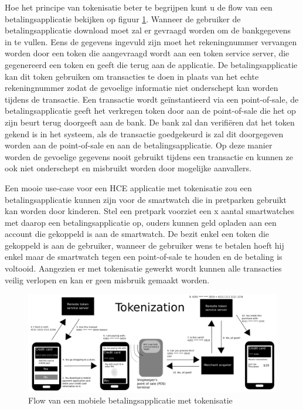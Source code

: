 Hoe het principe van tokenisatie beter te begrijpen kunt u de flow van een betalingsapplicatie bekijken op figuur \ref{fig:Tokenization}. Wanneer de gebruiker de betalingsapplicatie download moet zal er gevraagd worden om de bankgegevens in te vullen. Eens de gegevens ingevuld zijn moet het rekeningnummer vervangen worden door een token die aangevraagd wordt aan een token service server, die gegenereerd een token en geeft die terug aan de applicatie. De betalingsapplicatie kan dit token gebruiken om transacties te doen in plaats van het echte rekeningnummer zodat de gevoelige informatie niet onderschept kan worden tijdens de transactie. Een transactie wordt geïnstantieerd via een point-of-sale, de betalingsapplicatie geeft het verkregen token door aan de point-of-sale die het op zijn beurt terug doorgeeft aan de bank. De bank zal dan verifiëren dat het token gekend is in het systeem, als de transactie goedgekeurd is zal dit doorgegeven worden aan de point-of-sale en aan de betalingsapplicatie. Op deze manier worden de gevoelige gegevens nooit gebruikt tijdens een transactie en kunnen ze ook niet onderschept en misbruikt worden door mogelijke aanvallers.

Een mooie use-case voor een HCE applicatie met tokenisatie zou een betalingsapplicatie kunnen zijn voor de smartwatch die in pretparken gebruikt kan worden door kinderen. Stel een pretpark voorziet een x aantal smartwatches met daarop een betalingsapplicatie op, ouders kunnen geld opladen aan een account die gekoppeld is aan de smartwatch. De bezit enkel een token die gekoppeld is aan de gebruiker, wanneer de gebruiker wens te betalen hoeft hij enkel maar de smartwatch tegen een point-of-sale te houden en de betaling is voltooid. Aangezien er met tokenisatie gewerkt wordt kunnen alle transacties veilig verlopen en kan er geen misbruik gemaakt worden.

\begin{figure}
	\includegraphics[width=\linewidth]
	{img/Tokenization}
	\caption{Flow van een mobiele betalingsapplicatie met tokenisatie}
	\label{fig:Tokenization}
\end{figure}


